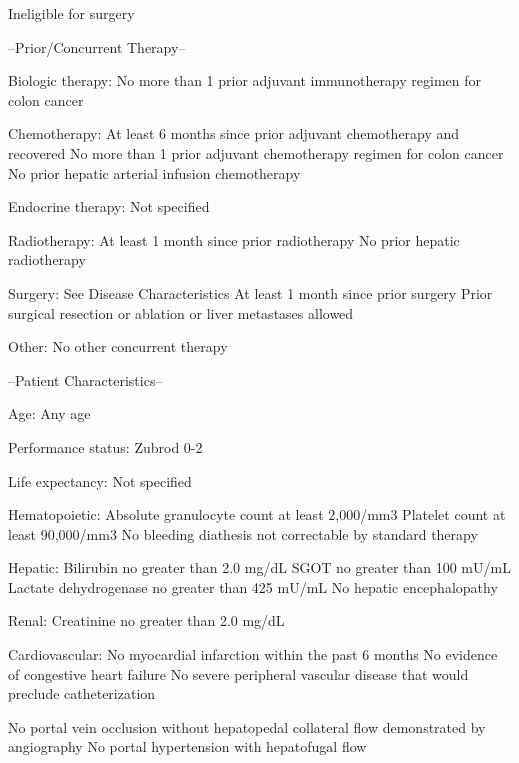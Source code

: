 \documentclass[12pt]{article}
\begin{document}
Ineligible for surgery
                                     
 


--Prior/Concurrent Therapy--
                                     
Biologic therapy:
No more than 1 prior adjuvant immunotherapy regimen for colon cancer
                                     
Chemotherapy:
At least 6 months since prior adjuvant chemotherapy and recovered
No more than 1 prior adjuvant chemotherapy regimen for colon cancer
No prior hepatic arterial infusion chemotherapy
                                     
Endocrine therapy:
Not specified
                                     
Radiotherapy:
At least 1 month since prior radiotherapy
No prior hepatic radiotherapy
                                     
Surgery:
See Disease Characteristics
At least 1 month since prior surgery
Prior surgical resection or ablation or liver metastases allowed
                                     
Other:
No other concurrent therapy
                                     
--Patient Characteristics--
                                     
Age:
Any age

Performance status:
Zubrod 0-2
                                     
Life expectancy:
Not specified
                                     
Hematopoietic:
Absolute granulocyte count at least 2,000/mm3
Platelet count at least 90,000/mm3
No bleeding diathesis not correctable by standard therapy
                                     
Hepatic:
Bilirubin no greater than 2.0 mg/dL
SGOT no greater than 100 mU/mL
Lactate dehydrogenase no greater than 425 mU/mL
No hepatic encephalopathy
                                     
Renal:
Creatinine no greater than 2.0 mg/dL
                                     
Cardiovascular:
No myocardial infarction within the past 6 months
No evidence of congestive heart failure
No severe peripheral vascular disease that would preclude catheterization
 


No portal vein occlusion without hepatopedal collateral flow demonstrated by
angiography
No portal hypertension with hepatofugal flow
                                     
\end{document}
